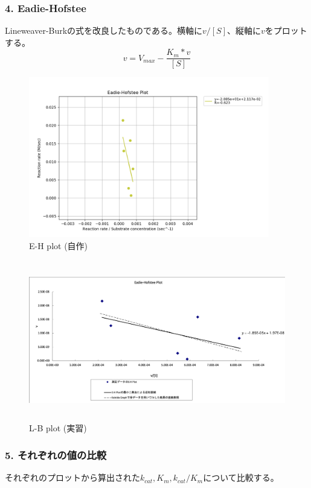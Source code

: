 \documentclass[a4paper,papersize,dvipdfmx]{jsarticle}
\begin{document}
\subsubsection*{4. Eadie-Hofstee}
Lineweaver-Burkの式を改良したものである。横軸に$v/[S]$、縦軸に$v$をプロットする。
\[v = V_{max} - \frac{K_m * v}{[S]}\]

\begin{figure}[H]
\begin{center}
\includegraphics[clip, height=7cm]{imgs/Eadie-Hofstee.png}
\caption{E-H plot (自作)}
\end{center}
\end{figure}

\begin{figure}[H]
\begin{center}
\includegraphics[clip, height=7cm]{imgs/11-eh.png}
\caption{L-B plot (実習)}
\end{center}
\end{figure}

\subsubsection*{5. それぞれの値の比較}
それぞれのプロットから算出された$k_{cat},
K_m,k_{cat}/K_m$について比較する。
\end{document}
